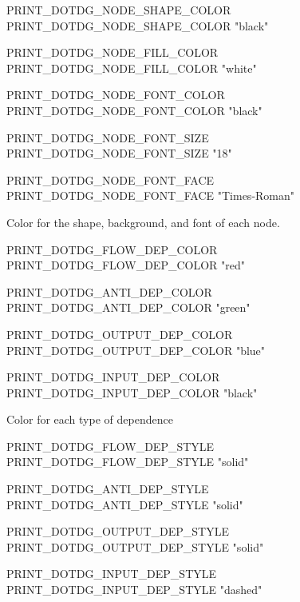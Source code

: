 \documentclass[a4paper]{report}
\begin{document}
\begin{PipsProp}{PRINT_DOTDG_NODE_SHAPE_COLOR}
PRINT_DOTDG_NODE_SHAPE_COLOR "black"
\end{PipsProp}

\begin{PipsProp}{PRINT_DOTDG_NODE_FILL_COLOR}
PRINT_DOTDG_NODE_FILL_COLOR "white"
\end{PipsProp}

\begin{PipsProp}{PRINT_DOTDG_NODE_FONT_COLOR}
PRINT_DOTDG_NODE_FONT_COLOR "black"
\end{PipsProp}
\begin{PipsProp}{PRINT_DOTDG_NODE_FONT_SIZE}
PRINT_DOTDG_NODE_FONT_SIZE "18"
\end{PipsProp}
\begin{PipsProp}{PRINT_DOTDG_NODE_FONT_FACE}
PRINT_DOTDG_NODE_FONT_FACE "Times-Roman"
\end{PipsProp}

Color for the shape, background, and font of each node.

\begin{PipsProp}{PRINT_DOTDG_FLOW_DEP_COLOR}
PRINT_DOTDG_FLOW_DEP_COLOR "red"
\end{PipsProp}
\begin{PipsProp}{PRINT_DOTDG_ANTI_DEP_COLOR}
PRINT_DOTDG_ANTI_DEP_COLOR "green"
\end{PipsProp}
\begin{PipsProp}{PRINT_DOTDG_OUTPUT_DEP_COLOR}
PRINT_DOTDG_OUTPUT_DEP_COLOR "blue"
\end{PipsProp}
\begin{PipsProp}{PRINT_DOTDG_INPUT_DEP_COLOR}
PRINT_DOTDG_INPUT_DEP_COLOR "black"
\end{PipsProp}

Color for each type of dependence

\begin{PipsProp}{PRINT_DOTDG_FLOW_DEP_STYLE}
PRINT_DOTDG_FLOW_DEP_STYLE "solid"
\end{PipsProp}
\begin{PipsProp}{PRINT_DOTDG_ANTI_DEP_STYLE}
PRINT_DOTDG_ANTI_DEP_STYLE "solid"
\end{PipsProp}
\begin{PipsProp}{PRINT_DOTDG_OUTPUT_DEP_STYLE}
PRINT_DOTDG_OUTPUT_DEP_STYLE "solid"
\end{PipsProp}
\begin{PipsProp}{PRINT_DOTDG_INPUT_DEP_STYLE}
PRINT_DOTDG_INPUT_DEP_STYLE "dashed"
\end{PipsProp}
\end{document}
